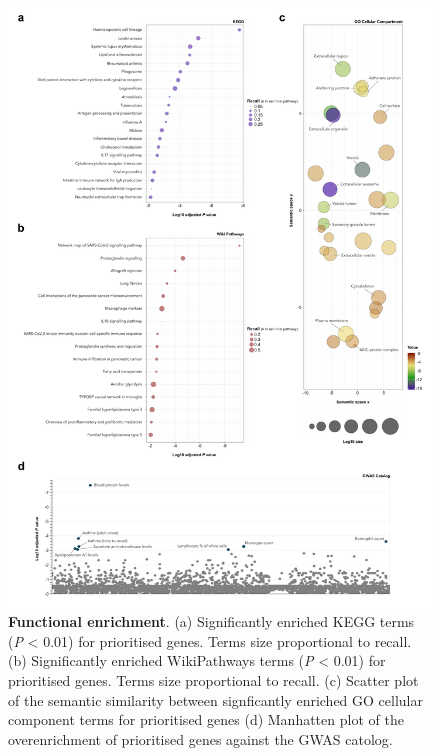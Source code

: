 \documentclass[
  11,
  a4paper,
]{article}
\begin{document}
\begin{figure}[H]

{\centering \includegraphics{../img/Supplementary_Figure_5.png}

}

\caption{\textbf{Functional enrichment}. (a) Significantly enriched KEGG
terms (\emph{P} \textless{} 0.01) for prioritised genes. Terms size
proportional to recall. (b) Significantly enriched WikiPathways terms
(\emph{P} \textless{} 0.01) for prioritised genes. Terms size
proportional to recall. (c) Scatter plot of the semantic similarity
between signficantly enriched GO cellular component terms for
prioritised genes (d) Manhatten plot of the overenrichment of
prioritised genes against the GWAS catolog.}

\end{figure}%
\end{document}
